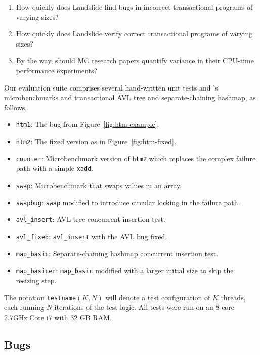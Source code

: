 \documentclass[10pt]{sigplanconf}
\begin{document}
\begin{enumerate}
	\item How quickly does Landslide find bugs in incorrect transactional programs of varying sizes?
	\item How quickly does Landslide verify correct transactional programs of varying sizes?
	\item By the way, should MC research papers quantify variance in their CPU-time performance experiments?
\end{enumerate}

Our evaluation suite comprises several hand-written unit tests
and \cite{htm-mario}'s microbenchmarks and transactional AVL tree and separate-chaining hashmap,
as follows.

\begin{itemize}
	\item {\tt htm1}: The bug from Figure~\ref{fig:htm-example}. %
	\item {\tt htm2}: The fixed version as in Figure~\ref{fig:htm-fixed}.
	\item {\tt counter}: Microbenchmark version of {\tt htm2} which replaces the complex failure path with a simple {\tt xadd}.
	\item {\tt swap}: Microbenchmark that swaps values in an array.
	\item {\tt swapbug}: {\tt swap} modified to introduce circular locking in the failure path. %
	\item {\tt avl\_insert}: AVL tree concurrent insertion test.
	\item {\tt avl\_fixed}: {\tt avl\_insert} with the AVL bug fixed. %
	\item {\tt map\_basic}: Separate-chaining hashmap concurrent insertion test.
	\item {\tt map\_basicer}: {\tt map\_basic} modified with a larger initial size to skip the resizing step.
\end{itemize}

The notation {\tt testname}$(K,N)$ will denote a test configuration of $K$ threads, each running $N$ iterations of the test logic.
All tests were run on an 8-core 2.7GHz Core i7 with 32 GB RAM.

\subsection{Bugs}
\end{document}

